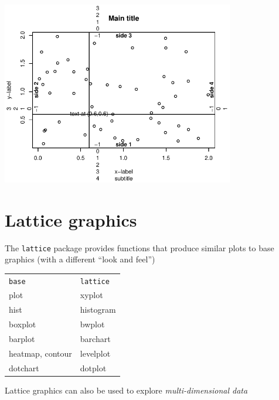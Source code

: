 \documentclass[xcolor=svgnames]{beamer}
\newcommand{\code}[1]{\texttt{#1}}
\begin{document}
\begin{frame}
  \centerline{\includegraphics[width=4in]{layout}}
\end{frame}

\section{Lattice graphics}

\begin{frame}

   The \code{lattice} package provides functions that produce similar
   plots to base graphics (with a different ``look and feel'')

   \begin{center}
   \begin{tabular}{ll}
    & \\
   \hline
   \code{base} & \code{lattice} \\
   \hline
   plot & xyplot \\
   hist & histogram \\
   boxplot & bwplot \\
   barplot & barchart \\
   heatmap, contour & levelplot \\
   dotchart & dotplot \\
   \hline
   \end{tabular}
   \end{center}

   Lattice graphics can also be used to explore {\em multi-dimensional data}

\end{frame}
\end{document}
